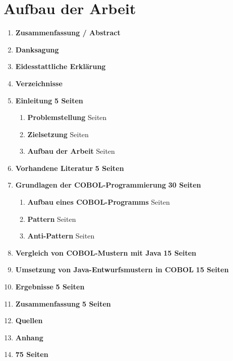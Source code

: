 \section{Aufbau der Arbeit}

\begin{framed}
\begin{enumerate}[label=\arabic*.]
	\item[] \textbf{Zusammenfassung / Abstract}
    \item[] \textbf{Danksagung}
    \item[] \textbf{Eidesstattliche Erklärung}
    \item[] \textbf{Verzeichnisse}
	\item 
    	\textbf{Einleitung} \dotfill \textbf{5 Seiten}
    	\begin{enumerate}[label=\arabic*.]
    		\item \textbf{Problemstellung}  Seiten
        	\item \textbf{Zielsetzung}  Seiten
            \item \textbf{Aufbau der Arbeit}  Seiten
    	\end{enumerate}
    \item \textbf{Vorhandene Literatur} \dotfill \textbf{5 Seiten}
    \item \textbf{Grundlagen der COBOL-Programmierung} \dotfill \textbf{30 Seiten}
    	\begin{enumerate}[label=\arabic*.]
    	\item \textbf{Aufbau eines COBOL-Programms}  Seiten
        \item \textbf{Pattern}  Seiten
        \item \textbf{Anti-Pattern}  Seiten
    	\end{enumerate}
    \item \textbf{Vergleich von COBOL-Mustern mit Java} \dotfill \textbf{15 Seiten}
    \item \textbf{Umsetzung von Java-Entwurfsmustern in COBOL} \dotfill \textbf{15 Seiten}
    \item \textbf{Ergebnisse} \dotfill \textbf{5 Seiten}
    \item \textbf{Zusammenfassung} \dotfill \textbf{5 Seiten}
    \item[] \textbf{Quellen}
    \item[] \textbf{Anhang}
    \item[] \hfill \textbf{75 Seiten}
\end{enumerate}
\end{framed}